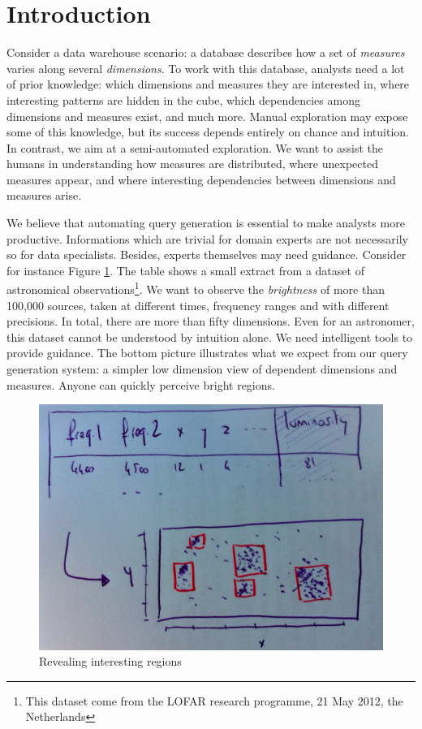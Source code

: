 \section{Introduction}
\label{sec:intro}

Consider a data warehouse scenario: a database describes how a set of
\emph{measures} varies along several \emph{dimensions}. To work with this
database, analysts need a lot of prior knowledge: which dimensions and measures
they are interested in, where interesting patterns are hidden in the cube,
which dependencies among dimensions and measures exist, and much more.  Manual
exploration may expose some of this knowledge, but its success depends entirely
on chance and intuition. In contrast, we aim at a semi-automated exploration.
We want to assist the humans in understanding how measures are distributed,
where unexpected measures appear, and where interesting dependencies between
dimensions and measures arise.

We believe that automating query generation is essential to make analysts more
productive. Informations which are trivial for domain experts are not
necessarily so for data specialists. Besides, experts themselves may need
guidance. Consider for instance Figure \ref{intro}. The table shows a small
extract from a dataset of astronomical observations\footnote{This dataset come
from the LOFAR research programme, 21 May 2012, the Netherlands}. We want to
observe the \emph{brightness} of more than 100,000 sources, taken at different
times, frequency ranges and with different precisions. In total, there are more
than fifty dimensions. Even for an astronomer, this dataset cannot be
understood by intuition alone. We need intelligent tools to provide guidance.
The bottom picture illustrates what we expect from our query generation system:
a simpler low dimension view of dependent dimensions and measures.  Anyone can
quickly perceive bright regions.

\begin{figure}[t!]
\centering
\includegraphics[width=0.8\columnwidth]{images/intro}
\caption{Revealing interesting regions}
\label{intro}
\end{figure}

